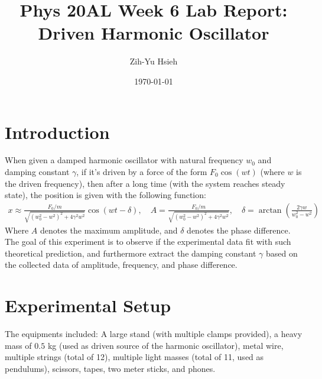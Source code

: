 \documentclass{article}
\title{Phys 20AL Week 6 Lab Report: Driven Harmonic Oscillator}
\author{Zih-Yu Hsieh}
\date{\today}
\begin{document}
\maketitle

\tableofcontents

\hfil

\section{Introduction}
When given a damped harmonic oscillator with natural frequency $w_0$ and damping constant $\gamma$, if it's driven by a force of the form $F_0 \cos(w t)$ (where $w$ is the driven frequency), then after a long time (with the system reaches steady state), the position is given with the following function:
\begin{align}
    x\approx \frac{F_0/m}{\sqrt{(w_0^2-w^2)^2+4\gamma^2w^2}}\cos(wt-\delta),\quad A=\frac{F_0/m}{\sqrt{(w_0^2-w^2)^2+4\gamma^2w^2}}, \quad \delta =\arctan\left(\frac{2\gamma w}{w_0^2-w^2}\right)
\end{align}
Where $A$ denotes the maximum amplitude, and $\delta$ denotes the phase difference. The goal of this experiment is to observe if the experimental data fit with such theoretical prediction, and furthermore extract the damping constant $\gamma$ based on the collected data of amplitude, frequency, and phase difference. %

\newpage

\section{Experimental Setup}
The equipments included: A large stand (with multiple clamps provided), a heavy mass of $0.5$ kg (used as driven source of the harmonic oscillator), metal wire, multiple strings (total of 12), multiple light masses (total of 11, used as pendulums), scissors, tapes, two meter sticks, and phones.
\end{document}
